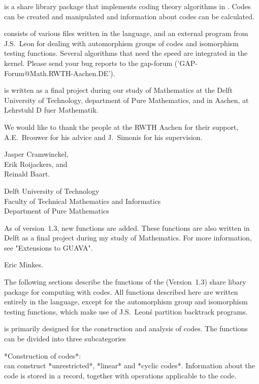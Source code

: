 {\GUAVA}    is a  share  library package    that implements coding theory
algorithms in   {\GAP}.    Codes can  be   created and   manipulated  and
information about codes can be calculated.

{\GUAVA} consists of various files written in the {\GAP} language, and an
external program from J.S.~Leon  for dealing with automorphism  groups of
codes and isomorphism testing functions. Several algorithms that need the
speed are  integrated in the {\GAP}  kernel. Please send your bug reports
to the gap-forum ('GAP-Forum@Math.RWTH-Aachen.DE').

{\GUAVA} is written as a final project during our study of Mathematics at
the Delft University of  Technology, department of Pure Mathematics,  and
in Aachen, at Lehrstuhl D fuer Mathematik.

We would like to  thank the {\GAP} people at  the  RWTH Aachen for  their
support, A.E.~Brouwer for his advice and J.~Simonis for his supervision.

Jasper Cramwinckel, \\
Erik Roijackers, and \\
Reinald Baart.

Delft University of Technology\\
Faculty of Technical Mathematics and Informatics\\
Department of Pure Mathematics

As of version~1.3, new functions are added. 
These functions  are also written  in Delft as a final project during my
study of Mathematics.  For more information, see "Extensions to GUAVA".

Eric Minkes.

The   following   sections  describe   the   functions  of  the  {\GUAVA}
(Version~1.3) share   libary  package   for computing   with   codes. All
functions described  here  are written  entirely  in the {\GAP} language,
except  for the  automorphism  group and  isomorphism  testing functions,
which make use of J.S.~Leon\'s partition backtrack programs.

{\GUAVA} is  primarily  designed for   the  construction and analysis  of
codes.  The functions can be divided into three subcategories\:

*Construction of codes*:\\
{\GUAVA}    can    construct    *unrestricted*,    *linear*  and  *cyclic
codes*. Information about  the code is stored in  a record, together with
operations applicable to the code.

